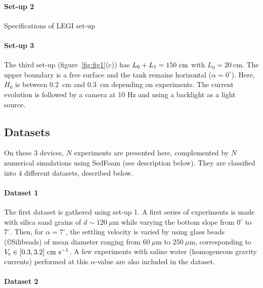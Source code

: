 \documentclass[twocolumn]{article}
\begin{document}
\paragraph{Set-up 2}

Specifications of LEGI set-up

\paragraph{Set-up 3}

The third set-up (figure~\ref{fig:fig1}(c)) has $L_0+L_1=150~\textup{cm}$ with $L_0 = 20~\textrm{cm}$. The upper boundary is a free surface and the tank remains horizontal ($\alpha = 0^\circ$). Here, $H_{0}$ is between 0.2~cm and 0.3~cm depending on experiments. The current evolution is followed by a camera at 10 Hz and using a backlight as a light source.


\subsection{Datasets}

On these 3 devices, $N$ experiments are presented here, complemented by $N$ numerical simulations using SedFoam (see description below). They are classified into 4 different datasets, described below.

\paragraph{Dataset 1}

The first dataset is gathered using set-up 1. A first series of experiments is made with silica sand grains of $d \sim 120~\mu\textrm{m}$ while varying the bottom slope from $0^\circ$ to $7^\circ$. Then, for $\alpha = 7^\circ$, the settling velocity is varied by using glass beads (©Silibeads) of mean diameter ranging from $60~\mu\textrm{m}$ to $250~\mu\textrm{m}$, corresponding to $V_{\rm s} \in [0.3, 3.2]~\textrm{cm}~\textrm{s}^{-1}$. A few experiments with saline water (homogeneous gravity currents) performed at this $\alpha$-value are also included in the dataset.

\paragraph{Dataset 2}
\end{document}
